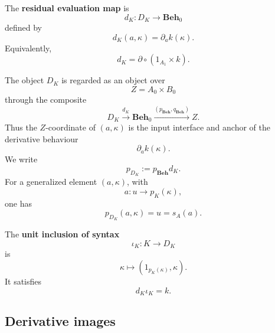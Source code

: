 \begin{definition}
\label{def:residual-evaluation}
    The \textbf{residual evaluation map} is
    \[
        d_K:D_K\to\mathbf{Beh}_0
    \]
    defined by
    \[
        d_K(a,\kappa)=\partial_a k(\kappa).
    \]
    Equivalently,
    \[
        d_K=
        \partial\circ(1_{A_1}\times k).
    \]
\end{definition}

The object \(D_K\) is regarded as an object over
\[
    Z=A_0\times B_0
\]
through the composite
\[
    D_K
        \xrightarrow{d_K}
    \mathbf{Beh}_0
        \xrightarrow{(p_{\mathbf{Beh}},q_{\mathbf{Beh}})}
    Z.
\]
Thus the \(Z\)-coordinate of \((a,\kappa)\) is the input interface and anchor of the derivative behaviour
\[
    \partial_a k(\kappa).
\]
We write
\[
    p_{D_K}:=p_{\mathbf{Beh}}d_K.
\]
For a generalized element \((a,\kappa)\), with
\[
    a:u\to p_K(\kappa),
\]
one has
\[
    p_{D_K}(a,\kappa)=u=s_A(a).
\]

\begin{definition}
\label{def:syntax-unit-inclusion}
    The \textbf{unit inclusion of syntax}
    \[
        \iota_K:K\to D_K
    \]
    is
    \[
        \kappa\longmapsto(1_{p_K(\kappa)},\kappa).
    \]
    It satisfies
    \[
        d_K\iota_K=k.
    \]
\end{definition}

\subsection{Derivative images}
\label{subsec:derivative-image}

